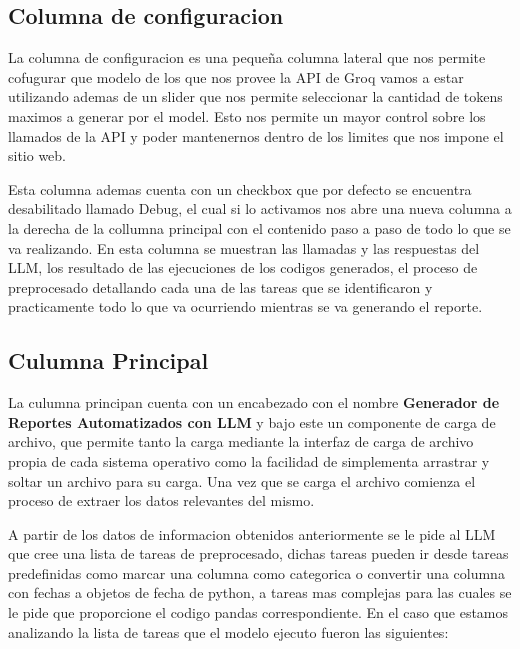 \subsection{Columna de configuracion}
La columna de configuracion es una pequeña columna lateral que nos permite cofugurar que modelo de los que nos provee la API de Groq vamos a estar utilizando ademas de un slider que nos permite seleccionar la cantidad de tokens maximos a generar por el model. Esto nos permite un mayor control sobre los llamados de la API y poder mantenernos dentro de los limites que nos impone el sitio web.

Esta columna ademas cuenta con un checkbox que por defecto se encuentra desabilitado llamado Debug, el cual si lo activamos nos abre una nueva columna a la derecha de la collumna principal con el contenido paso a paso de todo lo que se va realizando. En esta columna se muestran las llamadas y las respuestas del LLM, los resultado de las ejecuciones de los codigos generados, el proceso de preprocesado detallando cada una de las tareas que se identificaron y practicamente todo lo que va ocurriendo mientras se va generando el reporte.

\subsection{Culumna Principal}
La culumna principan cuenta con un encabezado con el nombre \textbf{Generador de Reportes Automatizados con LLM} y bajo este un componente de carga de archivo, que permite tanto la carga mediante la interfaz de carga de archivo propia de cada sistema operativo como la facilidad de simplementa arrastrar y soltar un archivo para su carga. Una vez que se carga el archivo comienza el proceso de extraer los datos relevantes del mismo.

A partir de los datos de informacion obtenidos anteriormente se le pide al LLM que cree una lista de tareas de preprocesado, dichas tareas pueden ir desde tareas predefinidas como marcar una columna como categorica o convertir una columna con fechas a objetos de fecha de python, a tareas mas complejas para las cuales se le pide que proporcione el codigo pandas correspondiente. En el caso que estamos analizando la lista de tareas que el modelo ejecuto fueron las siguientes:



